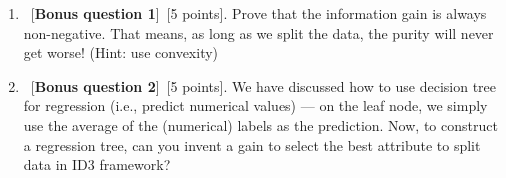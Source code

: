 \documentclass[12pt, fullpage,letterpaper]{article}
\begin{document}
\begin{enumerate}
\begin{enumerate}
\end{enumerate}

\item ~[\textbf{Bonus question 1}]~[5 points].  Prove that the information gain is always non-negative.  That means, as long as we split the data, the purity will never get worse! (Hint: use convexity)


\item ~[\textbf{Bonus question 2}]~[5 points].  We have discussed how to use decision tree for regression (i.e., predict numerical values) --- on the leaf node, we simply use the average of the (numerical) labels as the prediction.  Now, to construct a regression tree, can you invent a gain to select the best attribute to split data in ID3 framework?


\end{enumerate}
\end{document}
